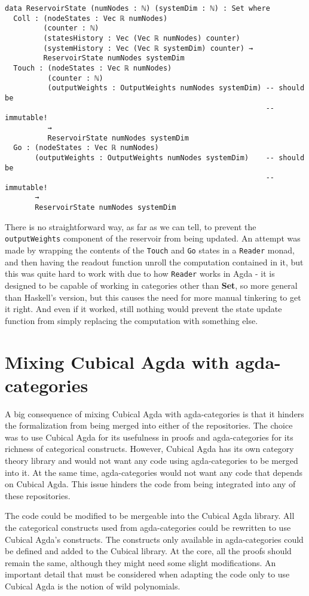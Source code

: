 \begin{verbatim}
data ReservoirState (numNodes : ℕ) (systemDim : ℕ) : Set where
  Coll : (nodeStates : Vec ℝ numNodes)
         (counter : ℕ)
         (statesHistory : Vec (Vec ℝ numNodes) counter) 
         (systemHistory : Vec (Vec ℝ systemDim) counter) → 
         ReservoirState numNodes systemDim
  Touch : (nodeStates : Vec ℝ numNodes)
          (counter : ℕ)
          (outputWeights : OutputWeights numNodes systemDim) -- should be
                                                             -- immutable!
          →
          ReservoirState numNodes systemDim
  Go : (nodeStates : Vec ℝ numNodes)
       (outputWeights : OutputWeights numNodes systemDim)    -- should be
                                                             -- immutable!
       →
       ReservoirState numNodes systemDim
\end{verbatim}

There is no straightforward way, as far as we can tell, to prevent the \texttt{outputWeights} component of the reservoir from being updated. An attempt was made by wrapping the contents of the \texttt{Touch} and \texttt{Go} states in a \texttt{Reader} monad, and then having the readout function unroll the computation contained in it, but this was quite hard to work with due to how \texttt{Reader} works in Agda - it is designed to be capable of working in categories other than \textbf{Set}, so more general than Haskell's version, but this causes the need for more manual tinkering to get it right. And even if it worked, still nothing would prevent the state update function from simply replacing the computation with something else.

\section{Mixing Cubical Agda with agda-categories}
A big consequence of mixing Cubical Agda with agda-categories is that it hinders the formalization from being merged into either of the repositories.
The choice was to use Cubical Agda for its usefulness in proofs and agda-categories for its richness of categorical constructs.
However, Cubical Agda has its own category theory library and would not want any code using agda-categories to be merged into it.
At the same time, agda-categories would not want any code that depends on Cubical Agda. This issue hinders the code from being integrated into any of these repositories.

The code could be modified to be mergeable into the Cubical Agda library. All the categorical constructs used from agda-categories could be rewritten to use Cubical Agda's constructs. The constructs only available in agda-categories could be defined and added to the Cubical library. At the core, all the proofs should remain the same, although they might need some slight modifications. An important detail that must be considered when adapting the code only to use Cubical Agda is the notion of wild polynomials.

